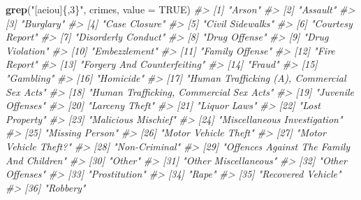 \documentclass[
  12pt,
]{book}
\newenvironment{Shaded}{\begin{snugshade}}{\end{snugshade}}
\newcommand{\CommentTok}[1]{\textcolor[rgb]{0.56,0.35,0.01}{\textit{#1}}}
\newcommand{\DataTypeTok}[1]{\textcolor[rgb]{0.13,0.29,0.53}{#1}}
\newcommand{\KeywordTok}[1]{\textcolor[rgb]{0.13,0.29,0.53}{\textbf{#1}}}
\newcommand{\NormalTok}[1]{#1}
\newcommand{\OtherTok}[1]{\textcolor[rgb]{0.56,0.35,0.01}{#1}}
\newcommand{\StringTok}[1]{\textcolor[rgb]{0.31,0.60,0.02}{#1}}
\begin{document}
\begin{Shaded}
\begin{Highlighting}[]
\KeywordTok{grep}\NormalTok{(}\StringTok{"[aeiou]\{,3\}"}\NormalTok{, crimes, }\DataTypeTok{value =} \OtherTok{TRUE}\NormalTok{)}
\CommentTok{\#>  [1] "Arson"                                     }
\CommentTok{\#>  [2] "Assault"                                   }
\CommentTok{\#>  [3] "Burglary"                                  }
\CommentTok{\#>  [4] "Case Closure"                              }
\CommentTok{\#>  [5] "Civil Sidewalks"                           }
\CommentTok{\#>  [6] "Courtesy Report"                           }
\CommentTok{\#>  [7] "Disorderly Conduct"                        }
\CommentTok{\#>  [8] "Drug Offense"                              }
\CommentTok{\#>  [9] "Drug Violation"                            }
\CommentTok{\#> [10] "Embezzlement"                              }
\CommentTok{\#> [11] "Family Offense"                            }
\CommentTok{\#> [12] "Fire Report"                               }
\CommentTok{\#> [13] "Forgery And Counterfeiting"                }
\CommentTok{\#> [14] "Fraud"                                     }
\CommentTok{\#> [15] "Gambling"                                  }
\CommentTok{\#> [16] "Homicide"                                  }
\CommentTok{\#> [17] "Human Trafficking (A), Commercial Sex Acts"}
\CommentTok{\#> [18] "Human Trafficking, Commercial Sex Acts"    }
\CommentTok{\#> [19] "Juvenile Offenses"                         }
\CommentTok{\#> [20] "Larceny Theft"                             }
\CommentTok{\#> [21] "Liquor Laws"                               }
\CommentTok{\#> [22] "Lost Property"                             }
\CommentTok{\#> [23] "Malicious Mischief"                        }
\CommentTok{\#> [24] "Miscellaneous Investigation"               }
\CommentTok{\#> [25] "Missing Person"                            }
\CommentTok{\#> [26] "Motor Vehicle Theft"                       }
\CommentTok{\#> [27] "Motor Vehicle Theft?"                      }
\CommentTok{\#> [28] "Non{-}Criminal"                              }
\CommentTok{\#> [29] "Offences Against The Family And Children"  }
\CommentTok{\#> [30] "Other"                                     }
\CommentTok{\#> [31] "Other Miscellaneous"                       }
\CommentTok{\#> [32] "Other Offenses"                            }
\CommentTok{\#> [33] "Prostitution"                              }
\CommentTok{\#> [34] "Rape"                                      }
\CommentTok{\#> [35] "Recovered Vehicle"                         }
\CommentTok{\#> [36] "Robbery"                                   }

\end{Highlighting}
\end{Shaded}
\end{document}
